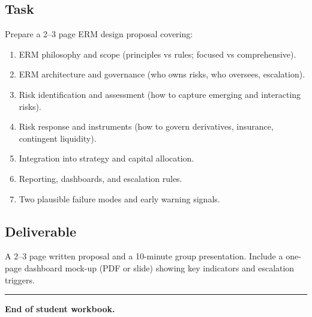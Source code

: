 \documentclass[11pt]{article}
\begin{document}
\subsection*{Task}
Prepare a 2--3 page ERM design proposal covering:
\begin{enumerate}
  \item ERM philosophy and scope (principles vs rules; focused vs comprehensive).
  \item ERM architecture and governance (who owns risks, who oversees, escalation).
  \item Risk identification and assessment (how to capture emerging and interacting risks).
  \item Risk response and instruments (how to govern derivatives, insurance, contingent liquidity).
  \item Integration into strategy and capital allocation.
  \item Reporting, dashboards, and escalation rules.
  \item Two plausible failure modes and early warning signals.
\end{enumerate}

\subsection*{Deliverable}
A 2--3 page written proposal and a 10-minute group presentation. Include a one-page dashboard mock-up (PDF or slide) showing key indicators and escalation triggers.

\bigskip
\hrule
\bigskip
\noindent\textbf{End of student workbook.}
\end{document}
